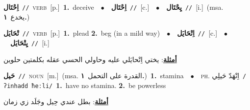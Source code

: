 \documentclass[10pt,a4paper,twoside]{article} %
\begin{document}
\begin{multicols}{2}
{\setlength\topsep{0pt}\textbf{\foreignlanguage{arabic}{اِحْتَال}}\ {\color{gray}\texttt{//}\color{black}}\ \textsc{verb}\ [p.]\ \textbf{1.}~deceive\ \ $\bullet$\ \ \setlength\topsep{0pt}\textbf{\foreignlanguage{arabic}{اِحْتَال}}\ {\color{gray}\texttt{//}\color{black}}\ [c.]\ \ $\bullet$\ \ \setlength\topsep{0pt}\textbf{\foreignlanguage{arabic}{يِحْتَال}}\ {\color{gray}\texttt{//}\color{black}}\ [i.]\ \color{gray}(msa. \foreignlanguage{arabic}{يخدع}~\foreignlanguage{arabic}{\textbf{١.}})\color{black}\ } \vspace{2mm}

{\setlength\topsep{0pt}\textbf{\foreignlanguage{arabic}{تْحَايَل}}\ {\color{gray}\texttt{//}\color{black}}\ \textsc{verb}\ [p.]\ \textbf{1.}~plead  \textbf{2.}~beg (in a mild way)\ \ $\bullet$\ \ \setlength\topsep{0pt}\textbf{\foreignlanguage{arabic}{اِتْحَايَل}}\ {\color{gray}\texttt{//}\color{black}}\ [c.]\ \ $\bullet$\ \ \setlength\topsep{0pt}\textbf{\foreignlanguage{arabic}{يِتْحَايَل}}\ {\color{gray}\texttt{//}\color{black}}\ [i.]\  \begin{flushright}\color{gray}\foreignlanguage{arabic}{\textbf{\underline{\foreignlanguage{arabic}{أمثلة}}}: يختي اِتْحايَلي عليه وحاولي الحسي عقله بكلمتين حلوين}\end{flushright}\color{black}} \vspace{2mm}

{\setlength\topsep{0pt}\textbf{\foreignlanguage{arabic}{حَيل}}\ {\color{gray}\texttt{//}\color{black}}\ \textsc{noun}\ [m.]\ \color{gray}(msa. \foreignlanguage{arabic}{القدرة على التحمل}~\foreignlanguage{arabic}{\textbf{١.}})\color{black}\ \textbf{1.}~stamina\ \ $\bullet$\ \ \textsc{ph.} \color{gray} \foreignlanguage{arabic}{اِنْهَدّ حَيلِي}\color{black}\ {\color{gray}\texttt{/{\sffamily ʔinhadd ħeːli}/}\color{black}}\ \textbf{1.}~have no stamina.  \textbf{2.}~be powerless\  \begin{flushright}\color{gray}\foreignlanguage{arabic}{\textbf{\underline{\foreignlanguage{arabic}{أمثلة}}}: بطل عندي حِيل وجَلَد زي زمان}\end{flushright}\color{black}} \vspace{2mm}


\end{multicols}
\end{document}
